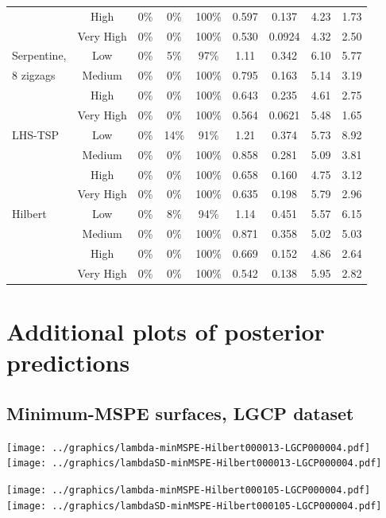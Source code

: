 \documentclass[review]{elsarticle}
\begin{document}
\begin{table}[h!]
\begin{tabular}{|l|c|c|c|c|cc|cc|}
&             High & 0\% & 0\% & 100\% & 0.597 & 0.137  & 4.23 & 1.73 \\
&        Very High & 0\% & 0\% & 100\% & 0.530 & 0.0924 & 4.32 & 2.50 \\
\hline
Serpentine, &  Low & 0\% & 5\% &  97\% & 1.11  & 0.342  & 6.10 & 5.77 \\
8 zigzags & Medium & 0\% & 0\% & 100\% & 0.795 & 0.163  & 5.14 & 3.19 \\
&             High & 0\% & 0\% & 100\% & 0.643 & 0.235  & 4.61 & 2.75 \\
&        Very High & 0\% & 0\% & 100\% & 0.564 & 0.0621 & 5.48 & 1.65 \\
\hline
LHS-TSP & Low & 0\% & 14\% &  91\% & 1.21  & 0.374 & 5.73 & 8.92 \\
&      Medium & 0\% &  0\% & 100\% & 0.858 & 0.281 & 5.09 & 3.81 \\
&        High & 0\% &  0\% & 100\% & 0.658 & 0.160 & 4.75 & 3.12 \\
&   Very High & 0\% &  0\% & 100\% & 0.635 & 0.198 & 5.79 & 2.96 \\
\hline
Hilbert & Low & 0\% & 8\% &  94\% & 1.14  & 0.451 & 5.57 & 6.15 \\
&      Medium & 0\% & 0\% & 100\% & 0.871 & 0.358 & 5.02 & 5.03 \\
&        High & 0\% & 0\% & 100\% & 0.669 & 0.152 & 4.86 & 2.64 \\
&   Very High & 0\% & 0\% & 100\% & 0.542 & 0.138 & 5.95 & 2.82 \\
\hline
\end{tabular}
\end{table}


\clearpage
\section{Additional plots of posterior predictions}
\label{moreplots}

\subsection{Minimum-MSPE surfaces, LGCP dataset}

\texttt{[image: ../graphics/lambda-minMSPE-Hilbert000013-LGCP000004.pdf]}
\texttt{[image: ../graphics/lambdaSD-minMSPE-Hilbert000013-LGCP000004.pdf]}

\texttt{[image: ../graphics/lambda-minMSPE-Hilbert000105-LGCP000004.pdf]}
\texttt{[image: ../graphics/lambdaSD-minMSPE-Hilbert000105-LGCP000004.pdf]}
\end{document}
